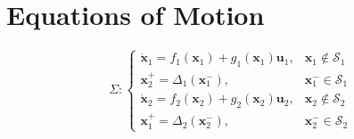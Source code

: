 \documentclass[11pt]{article}
\begin{document}
\section{Equations of Motion} 
\[
    \Sigma : 
\begin{cases}
    \mathbf{\dot{x}}_1 = f_1(\mathbf{x}_1) + g_1(\mathbf{x}_1) \mathbf{u}_1, & \mathbf{x}_1 \not\in \mathcal{S}_1 \\
    \mathbf{x}_2^+ = \Delta_1(\mathbf{x}_1^-), & \mathbf{x}_1^- \in \mathcal{S}_1 \\
    \mathbf{\dot{x}}_2 = f_2(\mathbf{x}_2) + g_2(\mathbf{x}_2) \mathbf{u}_2, & \mathbf{x}_2 \not\in \mathcal{S}_2 \\
    \mathbf{x}_1^+ = \Delta_2(\mathbf{x}_2^-), & \mathbf{x}_2^- \in \mathcal{S}_2 
\end{cases}
\]
\end{document}
